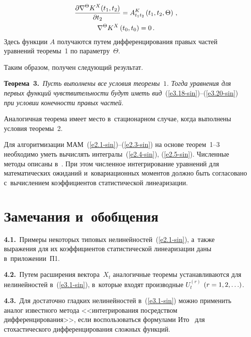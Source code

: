 \begin{multicols}{2}
    \vspace*{-14pt}
    
    \noindent
    \begin{multline}
     \displaystyle\frac{\displaystyle \partial \nabla^\Theta K^X (t_1,t_2)\mathstrut}{\displaystyle \partial t_2\mathstrut} = 
    A_{t_1t_2}^K \left(t_1, t_2,\Theta\right)\,,\\
    \nabla^\Theta K^X \left(t_0, t_0\right)=0\,.
        \label{e3.20-sin}
    \end{multline}
Здесь функции $A$ получаются путем дифференцирования правых частей уравнений теоремы~1 
по параметру~$\Theta$.

Таким образом, получен следующий результат.

\medskip

\noindent
\textbf{Теорема~3.}\ \textit{Пусть выполнены все условия теоремы~$1$. 
Тогда уравнения для первых функций чувствитель\-ности будут иметь вид}~(\ref{e3.18-sin})--(\ref{e3.20-sin}) 
\textit{при условии ко\-неч\-ности правых частей}.

\smallskip

Аналогичная теорема имеет место в~стационарном случае, 
когда выполнены условия теоремы~2.

Для алгоритмизации МАМ~(\ref{e2.1-sin})--(\ref{e2.3-sin}) на основе теорем~1--3 
необходимо уметь вычислять интегралы~(\ref{e2.4-sin}), (\ref{e2.5-sin}). 
Численные методы описаны в~\cite{8-sin, 9-sin}. 
При этом численное интегрирование уравнений для математических ожиданий 
и~ковариационных моментов должно быть согласовано с~вычислением коэффициентов 
статистической линеаризации.


\section{Замечания и~обобщения}


\noindent
\textbf{4.1.}\ Примеры некоторых типовых нелинейностей~(\ref{e2.1-sin}), 
а~также выражения для их 
коэффициентов статистической линеаризации даны в~приложении~П1.

\noindent
\textbf{4.2.}\ Путем расширения вектора~$X_t$ аналогичные тео\-ре\-мы устанавливаются для 
нелинейностей в~(\ref{e3.1-sin}), в~которые входят производные $U_t^{(r)}$ 
$(r\hm=1,2,\ldots)$.

\noindent
\textbf{4.3.}\  Для достаточно гладких нелинейностей в~(\ref{e3.1-sin}) 
можно применить аналог известного метода <<интегрирования посредством 
дифференцирования>>, если воспользоваться формулами Ито~\cite{1-sin, 2-sin} 
для стохастического дифференцирования сложных функций.


\end{multicols}
